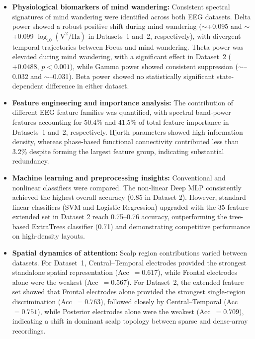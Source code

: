\documentclass[conference]{IEEEtran}
\begin{document}
\begin{itemize}
    \item \textbf{Physiological biomarkers of mind wandering:} Consistent spectral signatures of mind wandering were identified across both EEG datasets. Delta power showed a robust positive shift during mind wandering ($\sim$+0.095 and $\sim$+0.099 $\log_{10}(\mathrm{V}^2/\mathrm{Hz})$ in Datasets~1 and~2, respectively), with divergent temporal trajectories between Focus and mind wandering. Theta power was elevated during mind wandering, with a significant effect in Dataset~2 ($+0.0488$, $p<0.001$), while Gamma power showed consistent suppression ($\sim$--0.032 and $\sim$--0.031). Beta power showed no statistically significant state-dependent difference in either dataset.
    \item \textbf{Feature engineering and importance analysis:} The contribution of different EEG feature families was quantified, with spectral band-power features accounting for 50.4\% and 41.5\% of total feature importance in Datasets~1 and~2, respectively. Hjorth parameters showed high information density, whereas phase-based functional connectivity contributed less than 3.2\% despite forming the largest feature group, indicating substantial redundancy.
    \item \textbf{Machine learning and preprocessing insights:} Conventional and nonlinear classifiers were compared. The non-linear Deep MLP consistently achieved the highest overall accuracy (0.85 in Dataset 2). However, standard linear classifiers (SVM and Logistic Regression) upgraded with the 35-feature extended set in Dataset 2 reach 0.75--0.76 accuracy, outperforming the tree-based ExtraTrees classifier (0.71) and demonstrating competitive performance on high-density layouts.
    \item \textbf{Spatial dynamics of attention:} Scalp region contributions varied between datasets. For Dataset~1, Central--Temporal electrodes provided the strongest standalone spatial representation (Acc~$=0.617$), while Frontal electrodes alone were the weakest (Acc~$=0.567$). For Dataset~2, the extended feature set showed that Frontal electrodes alone provided the strongest single-region discrimination (Acc~$=0.763$), followed closely by Central--Temporal (Acc~$=0.751$), while Posterior electrodes alone were the weakest (Acc~$=0.709$), indicating a shift in dominant scalp topology between sparse and dense-array recordings.
\end{itemize}
\end{document}
